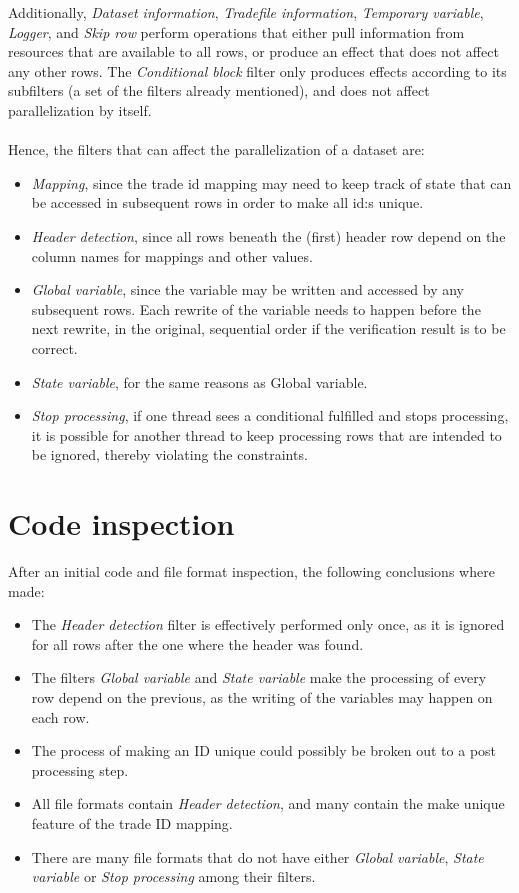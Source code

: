 Additionally, \textit{Dataset information}, \textit{Tradefile information}, \textit{Temporary variable}, \textit{Logger}, and \textit{Skip row} perform
operations that either pull information from resources that are available to all rows, or produce an effect that does not affect any other rows.
The \textit{Conditional block} filter only produces effects according to its subfilters (a set of the filters already mentioned), and does not affect parallelization by itself.
\\\\
Hence, the filters that can affect the parallelization of a dataset are:
\begin{itemize}
  \item \textit{Mapping}, since the trade id mapping may need to keep track of state that can be accessed in subsequent rows in order to make all id:s unique.
  \item \textit{Header detection}, since all rows beneath the (first) header row depend on the column names for mappings and other values.
  \item \textit{Global variable}, since the variable may be written and accessed by any subsequent rows. Each rewrite of the variable needs to happen before the next rewrite,
    in the original, sequential order if the verification result is to be correct.
  \item \textit{State variable}, for the same reasons as Global variable.
  \item \textit{Stop processing}, if one thread sees a conditional fulfilled and stops processing, it is possible for another thread to keep processing rows that are intended
    to be ignored, thereby violating the constraints.
\end{itemize}

\section{Code inspection}
After an initial code and file format inspection, the following conclusions where made:
\begin{itemize}
  \item The \textit{Header detection} filter is effectively performed only once, as it is ignored for all rows after the one where the header was found.
  \item The filters \textit{Global variable} and \textit{State variable} make the processing of every row depend on the previous, as the writing of the variables may happen on each row.
  \item The process of making an ID unique could possibly be broken out to a post processing step.
  \item All file formats contain \textit{Header detection}, and many contain the make unique feature of the trade ID mapping.
  \item There are many file formats that do not have either \textit{Global variable}, \textit{State variable} or \textit{Stop processing} among their filters.
\end{itemize}

